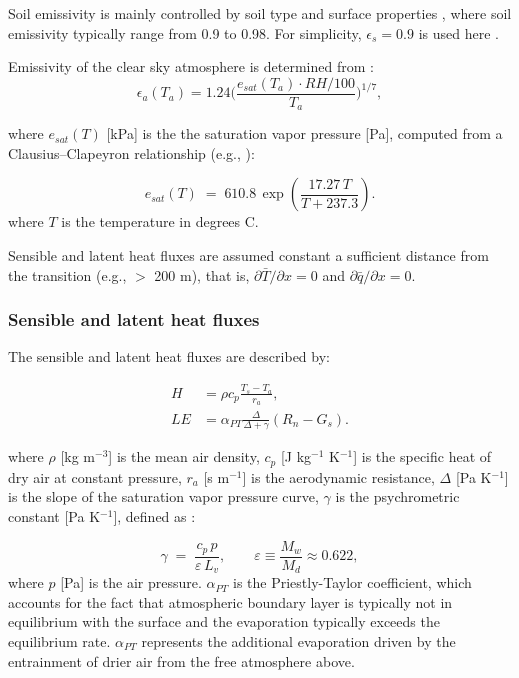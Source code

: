 \documentclass{article}
\begin{document}
    Soil emissivity is mainly controlled by soil type and surface properties \cite{evett2011water}, where soil emissivity typically range from 0.9 to 0.98. For simplicity, $\epsilon_s = 0.9$ is used here \cite{an2017assessment}.
    
    Emissivity of the clear sky atmosphere is determined from \cite{brutsaert1975derivable}: 
    \begin{equation}
        \epsilon_a (T_a) = 1.24 \bigg( \frac{e_{sat}(T_a)\cdot RH/100}{T_a}\bigg)^{1/7}, 
    \end{equation}
     
     where  $e_{sat}(T)$ [kPa] is the  the saturation vapor pressure [Pa], computed from a 
     Clausius--Clapeyron relationship (e.g., \cite{monteith1994principles}):
    
    \begin{equation}
    e_{sat}(T) \;=\; 610.8 \,\exp\!\left(\frac{17.27\,T}{T+237.3}\right).
    \end{equation}
    where $T$ is the temperature in degrees C.
     
     Sensible and latent heat fluxes are  assumed constant a sufficient distance from the transition (e.g., $>$ 200 m), that is,  $ {\partial \bar T}/{\partial x}  = 0$ and   $ {\partial \bar q}/{\partial x}= 0$.
    
    \subsubsection{Sensible and latent heat fluxes}
    
    The sensible and latent heat fluxes are described by:
    
    \begin{align}
    \label{eq:H_bulk}
    H &= \rho c_p\frac{T_s - T_a}{r_a},\\
    LE &= \alpha_{PT} \frac{\Delta}{\Delta+\gamma}(R_n - G_s).
    \label{eq:LE_eq}
    \end{align}
     
    where $\rho$ [kg m$^{-3}$] is the mean air density, 
    $c_p$ [J kg$^{-1}$ K$^{-1}$] is the specific heat of dry air at constant pressure,  $r_a$ [s m$^{-1}$] is the aerodynamic resistance,  $\Delta$ [Pa K$^{-1}$] is the slope of the saturation vapor pressure curve, 
    $\gamma$ is the psychrometric constant [Pa K$^{-1}$], defined as \citep{monteith1994principles}: 
    
    \begin{equation}
    \gamma \;=\; \frac{c_p\,p}{\varepsilon\,L_v},
    \qquad \varepsilon \equiv \frac{M_w}{M_d}\approx 0.622,
    \label{eq:psychrometric_constant}
    \end{equation}
    where $p$ [Pa] is the air pressure.
     $\alpha_{PT}$ is the Priestly-Taylor coefficient, which accounts for the fact that  atmospheric boundary layer is typically not in equilibrium with the surface and the evaporation typically exceeds the equilibrium rate.
     $\alpha_{PT}$ represents the additional evaporation driven by the entrainment of drier air from the free atmosphere above.
    
\end{document}
